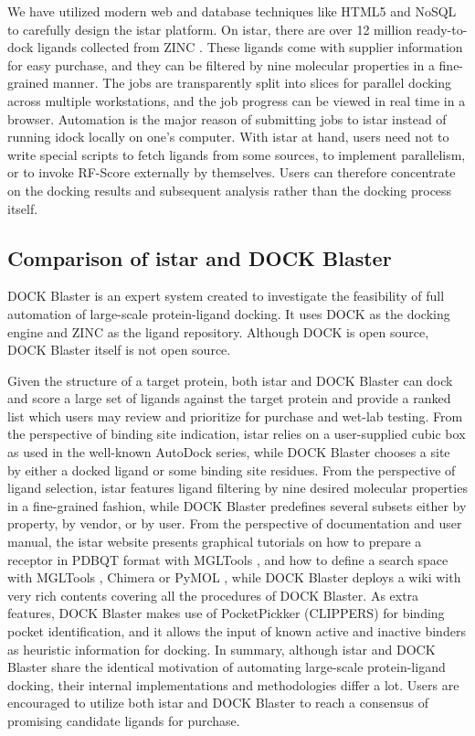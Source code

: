 \documentclass[10pt]{article}
\begin{document}
We have utilized modern web and database techniques like HTML5 and NoSQL to carefully design the istar platform. On istar, there are over 12 million ready-to-dock ligands collected from ZINC \cite{532,1178}. These ligands come with supplier information for easy purchase, and they can be filtered by nine molecular properties in a fine-grained manner. The jobs are transparently split into slices for parallel docking across multiple workstations, and the job progress can be viewed in real time in a browser. Automation is the major reason of submitting jobs to istar instead of running idock locally on one's computer. With istar at hand, users need not to write special scripts to fetch ligands from some sources, to implement parallelism, or to invoke RF-Score externally by themselves. Users can therefore concentrate on the docking results and subsequent analysis rather than the docking process itself.

\subsection*{Comparison of istar and DOCK Blaster}
DOCK Blaster \cite{557} is an expert system created to investigate the feasibility of full automation of large-scale protein-ligand docking. It uses DOCK \cite{1222} as the docking engine and ZINC \cite{532,1178} as the ligand repository. Although DOCK is open source, DOCK Blaster itself is not open source.

Given the structure of a target protein, both istar and DOCK Blaster can dock and score a large set of ligands against the target protein and provide a ranked list which users may review and prioritize for purchase and wet-lab testing. From the perspective of binding site indication, istar relies on a user-supplied cubic box as used in the well-known AutoDock series, while DOCK Blaster chooses a site by either a docked ligand or some binding site residues. From the perspective of ligand selection, istar features ligand filtering by nine desired molecular properties in a fine-grained fashion, while DOCK Blaster predefines several subsets either by property, by vendor, or by user. From the perspective of documentation and user manual, the istar website presents graphical tutorials on how to prepare a receptor in PDBQT format with MGLTools \cite{596}, and how to define a search space with MGLTools \cite{596}, Chimera \cite{1219} or PyMOL \cite{1221}, while DOCK Blaster deploys a wiki with very rich contents covering all the procedures of DOCK Blaster. As extra features, DOCK Blaster makes use of PocketPickker (CLIPPERS) \cite{395} for binding pocket identification, and it allows the input of known active and inactive binders as heuristic information for docking. In summary, although istar and DOCK Blaster share the identical motivation of automating large-scale protein-ligand docking, their internal implementations and methodologies differ a lot. Users are encouraged to utilize both istar and DOCK Blaster to reach a consensus of promising candidate ligands for purchase.
\end{document}
